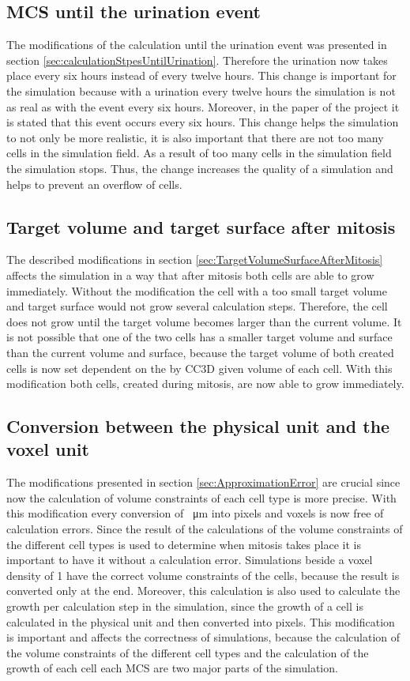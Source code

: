 \subsection{\ac{MCS} until the urination event}
The modifications of the calculation until the urination event was presented in section \ref{sec:calculationStpesUntilUrination}. Therefore the urination now takes place every six hours instead of every twelve hours. This change is important for the simulation because with a urination every twelve hours the simulation is not as real as with the event every six hours. Moreover, in the paper \cite{Torelli2017} of the project it is stated that this event occurs every six hours. This change helps the simulation to not only be more realistic, it is also important that there are not too many cells in the simulation field. As a result of too many cells in the simulation field the simulation stops. Thus, the change increases the quality of a simulation and helps to prevent an overflow of cells.
\subsection{Target volume and target surface after mitosis}
The described modifications in section \ref{sec:TargetVolumeSurfaceAfterMitosis} affects the simulation in a way that after mitosis both cells are able to grow immediately. Without the modification the cell with a too small target volume and target surface would not grow several calculation steps. Therefore, the cell does not grow until the target volume becomes larger than the current volume. It is not possible that one of the two cells has a smaller target volume and surface than the current volume and surface, because the target volume of both created cells is now set dependent on the by \ac{CC3D} given volume of each cell. With this modification both cells, created during mitosis, are now able to grow immediately.
\subsection{Conversion between the physical unit and the voxel unit}
The modifications presented in section \ref{sec:ApproximationError} are crucial since now the calculation of volume constraints of each cell type is more precise. With this modification every conversion of \SI{}{\micro\metre} into pixels and voxels is now free of calculation errors. Since the result of the calculations of the volume constraints of the different cell types is used to determine when mitosis takes place it is important to have it without a calculation error. Simulations beside a voxel density of 1 have the correct volume constraints of the cells, because the result is converted only at the end. Moreover, this calculation is also used to calculate the growth per calculation step in the simulation, since the growth of a cell is calculated in the physical unit and then converted into pixels. This modification is important and affects the correctness of simulations, because the calculation of the volume constraints of the different cell types and the calculation of the growth of each cell each \ac{MCS} are two major parts of the simulation.\newline
\newline

